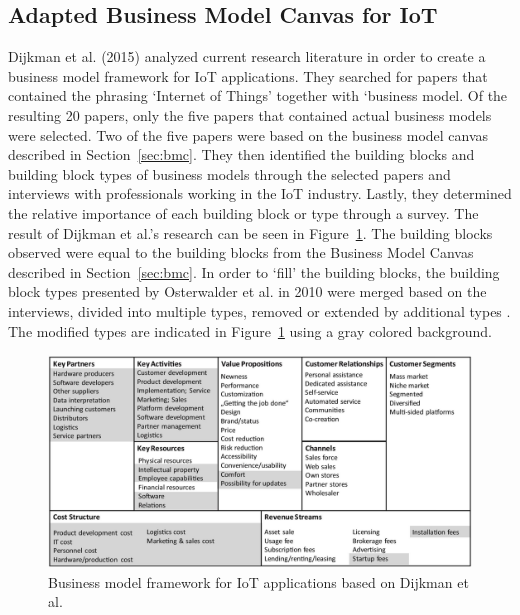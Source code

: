 	\subsection{Adapted Business Model Canvas for IoT}
		Dijkman et al. (2015) \cite{dijkman} analyzed current research literature in order to create a business model framework for IoT applications. They searched for papers that contained the phrasing `Internet of Things' together with `business model. Of the resulting 20 papers, only the five papers that contained actual business models were selected. Two of the five papers were based on the business model canvas described in Section~\ref{sec:bmc}. They then identified the building blocks and building block types of business models through the selected papers and interviews with professionals working in the IoT industry. Lastly, they determined the relative importance of each building block or type through a survey. The result of Dijkman et al.'s research can be seen in Figure~\ref{fig:bm_dijkman}. The building blocks observed were equal to the building blocks from the Business Model Canvas described in Section~\ref{sec:bmc}. In order to `fill' the building blocks, the building block types presented by Osterwalder et al. in 2010 were merged based on the interviews, divided into multiple types, removed or extended by additional types \cite{osterwalder2010} \cite{dijkman}. The modified types are indicated in Figure~\ref{fig:bm_dijkman} using a gray colored background.

		\begin{figure}[ht]
			\begin{center}
		    \includegraphics[scale=0.52]{Talk11/iot_canvas_dijkman.jpg}
		    \end{center}
		    \caption{Business model framework for IoT applications based on Dijkman et al. \cite{dijkman}}
		    \label{fig:bm_dijkman}
		\end{figure}

